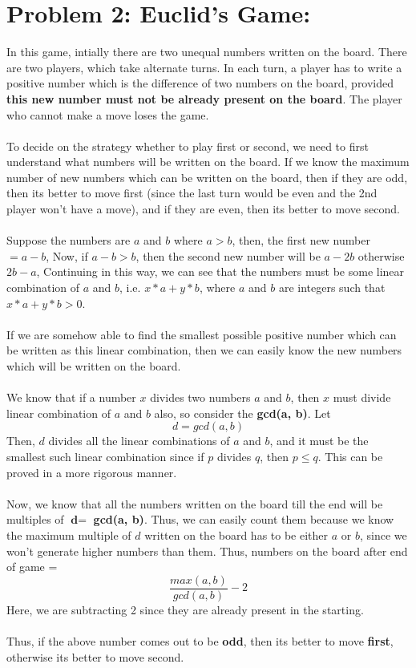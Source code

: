 \documentclass[12pt]{report}
\begin{document}
\section{Problem 2: Euclid's Game:}
In this game, intially there are two unequal numbers written on the board. There are two players, which take alternate turns. In each turn, a player has to write a positive number which is the difference of two numbers on the board, provided \textbf{this new number must not be already present on the board}. The player who cannot make a move loses the game. 
\\ \\ 
To decide on the strategy whether to play first or second, we need to first understand what numbers will be written on the board. If we know the maximum number of new numbers which can be written on the board, then if they are odd, then its better to move first (since the last turn would be even and the 2nd player won't have a move), and if they are even, then its better to move second. 
\\ \\
Suppose the numbers are $a$ and $b$ where $a > b$, then, the first new number $= a - b$, Now, if $a - b > b$, then the second new number will be $a - 2b$ otherwise $2b - a$, Continuing in this way, we can see that the numbers must be some linear combination of $a$ and $b$, i.e. $x*a + y*b$, where  $a$ and $b$ are integers such that $x*a + y*b > 0$.
\\ \\
If we are somehow able to find the smallest possible positive number which can be written as this linear combination, then we can easily know the new numbers which will be written on the board. 
\\ \\
We know that if a number $x$ divides two numbers $a$ and $b$, then $x$ must divide linear combination of $a$ and $b$ also, so consider the \textbf{gcd(a, b)}. Let 
\[ d = gcd(a, b) \]
Then, $d$ divides all the linear combinations of $a$ and $b$, and it must be the smallest such linear combination since if $p$ divides $q$, then $ p \leq q$. 
This can be proved in a more rigorous manner.
\\ \\ 
Now, we know that all the numbers written on the board till the end will be multiples of $\textbf{d}=$ \textbf{gcd(a, b)}. Thus, we can easily count them because we know the maximum multiple of  $d$ written on the board has to be either $a$ or $b$, since we won't generate higher numbers than them. Thus, numbers on the board after end of game = 
\[\frac{max(a, b)}{gcd(a, b)} - 2\]
Here, we are subtracting 2 since they are already present in the starting. 
\\ \\
Thus, if the above number comes out to be \textbf{odd}, then its better to move \textbf{first}, otherwise its better to move second.
\end{document}
